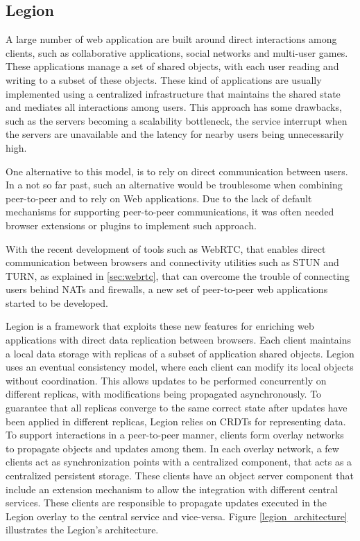 \subsection{Legion}
\label{sec:legion_intro}
A large number of web application are built around direct interactions among clients, such as collaborative applications, social networks and multi-user games. These applications manage a set of shared objects, with each user reading and writing to a subset of these objects. These kind of applications are usually implemented using a centralized infrastructure that maintains the shared state and mediates all interactions among users. This approach has some drawbacks, such as the servers becoming a scalability bottleneck, the service interrupt when the servers are unavailable and the latency for nearby users being unnecessarily high.\par
	One alternative to this model, is to rely on direct communication between users. In a not so far past, such an alternative would be troublesome when combining peer-to-peer and to rely on Web applications. Due to the lack of default mechanisms for supporting peer-to-peer communications, it was often needed browser extensions or plugins to implement such approach.\par
	With the recent development of tools such as WebRTC\cite{webrtc}, that enables direct communication between browsers and connectivity utilities such as STUN and TURN, as explained in \ref{sec:webrtc}, that can overcome the trouble of connecting users behind NATs and firewalls, a new set of peer-to-peer web applications started to be developed.\par
	Legion is a framework that exploits these new features for enriching web applications with direct data replication between browsers. Each client maintains a local data storage with replicas of a subset of application shared objects. Legion uses an eventual consistency model, where each client can modify its local objects without coordination. This allows updates to be performed concurrently on different replicas, with modifications being propagated asynchronously. To guarantee that all replicas converge to the same correct state after updates have been applied in different replicas, Legion relies on CRDTs\cite{crdt} for representing data. To support interactions in a peer-to-peer manner, clients form overlay networks to propagate objects and updates among them. In each overlay network, a few clients act as synchronization points with a centralized component, that acts as a centralized persistent storage. These clients have an object server component that include an extension mechanism to allow the integration with different central services. These clients are responsible to propagate updates executed in the Legion overlay to the central service and vice-versa. Figure \ref{legion_architecture} illustrates the Legion's architecture.
	

